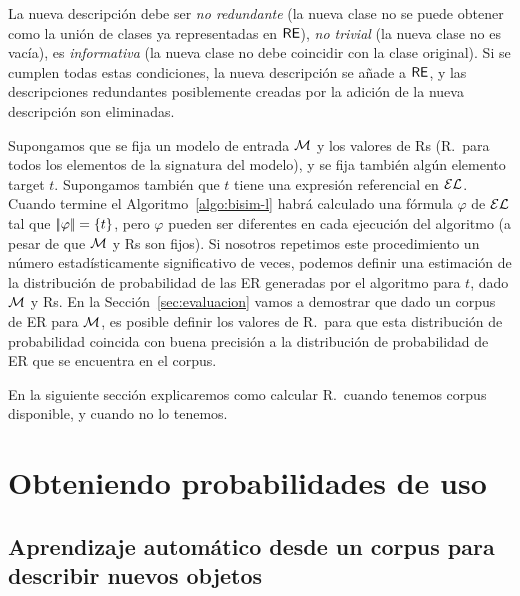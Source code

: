 La nueva descripci\'on debe ser
\emph{no redundante} (la nueva clase no se puede obtener como la uni\'on de
clases ya representadas en $\textsf{RE}$), \emph{no trivial} (la nueva
clase no es vac\'{i}a), es \emph{informativa} (la nueva clase no debe
coincidir con la clase original). Si se cumplen todas estas condiciones,
la nueva descripci\'on se a\~nade a $\textsf{RE}$, y las descripciones redundantes
posiblemente creadas por la adici\'on de la nueva descripci\'on son
eliminadas.

Supongamos que se fija un modelo de entrada $\mathcal{M}$ y los valores de Rs (R.\puse \ para todos los elementos de la signatura del modelo), y se fija tambi\'en alg\'un elemento target $t$. Supongamos tambi\'en que $t$ tiene una expresi\'on referencial en 
$\mathcal{EL}$. Cuando termine el
Algoritmo~\ref{algo:bisim-l} habr\'a calculado una f\'ormula $\varphi$ de $\mathcal{EL}$ tal
que $|\!|\varphi|\!| = \{t\}$, pero $\varphi$ pueden ser diferentes en
cada ejecuci\'on del algoritmo (a pesar de que $\mathcal{M}$ y Rs son fijos). Si nosotros
repetimos este procedimiento un n\'umero estad\'{i}sticamente significativo de veces,
podemos definir una estimaci\'on de la distribuci\'on de probabilidad de las ER
generadas por el algoritmo para $t$, dado $\mathcal{M}$ y Rs. En la
Secci\'on~\ref{sec:evaluacion} vamos a demostrar que dado un corpus de ER
para $\mathcal{M}$, es posible definir los valores de R.\puse\ para que esta
distribuci\'on de probabilidad coincida con buena precisi\'on a la distribuci\'on de probabilidad
 de ER que se encuentra en el corpus.

En la siguiente secci\'on explicaremos como calcular R.\puse\ cuando tenemos corpus disponible, y cuando no lo tenemos.

\section{Obteniendo probabilidades de uso}

\subsection{Aprendizaje autom\'atico desde un corpus para describir nuevos objetos}
\label{sec:learning}



